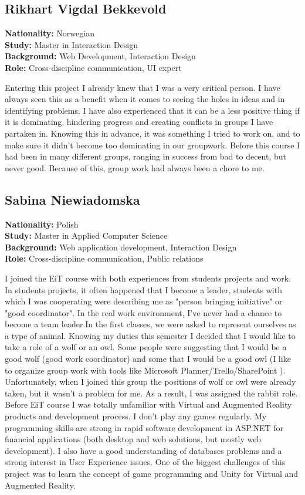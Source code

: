 \subsection{Rikhart Vigdal Bekkevold}
\textbf{Nationality:} Norwegian \\
\textbf{Study:} Master in Interaction Design \\
\textbf{Background:} Web Development, Interaction Design \\
\textbf{Role:} Cross-discipline communication, UI expert

Entering this project I already knew that I was a very critical person. I have always seen this as a benefit when it comes to seeing the holes in ideas and in identifying problems. I have also experienced that it can be a less positive thing if it is dominating, hindering progress and creating conflicts in groups I have partaken in. Knowing this in advance, it was something I tried to work on, and to make sure it didn’t become too dominating in our groupwork. Before this course I had been in many different groups, ranging in success from bad to decent, but never good. Because of this, group work had always been a chore to me.


\subsection{Sabina Niewiadomska}
\textbf{Nationality:} Polish \\
\textbf{Study:} Master in Applied Computer Science \\
\textbf{Background:} Web application development, Interaction Design \\
\textbf{Role:} Cross-discipline communication, Public relations

I joined the EiT course with both experiences from students projects and work. In students projects, it often happened that I become a leader, students with which I was cooperating were describing me as "person bringing initiative" or "good coordinator". In the real work environment, I've never had a  chance to become a team leader.In the first classes, we were asked to represent ourselves as a type of animal. Knowing my duties this semester I decided that I would like to take a role of a wolf or an owl. Some people were suggesting that I would be a good wolf (good work coordinator) and some that I would be a good owl (I like to organize group work with tools like Microsoft Planner/Trello/SharePoint ). Unfortunately, when I joined this group the positions of wolf or owl were already taken, but it wasn't a problem for me. As a result, I was assigned the rabbit role. Before EiT course I was totally unfamiliar with Virtual and Augmented Reality products and development process. I don't play any games regularly. My programming skills are strong in rapid software development in ASP.NET for financial applications (both desktop and web solutions, but mostly web development). I also have a good understanding of databases problems and a strong interest in User Experience issues. One of the biggest challenges of this project was to learn the concept of game programming and Unity for Virtual and Augmented Reality.

